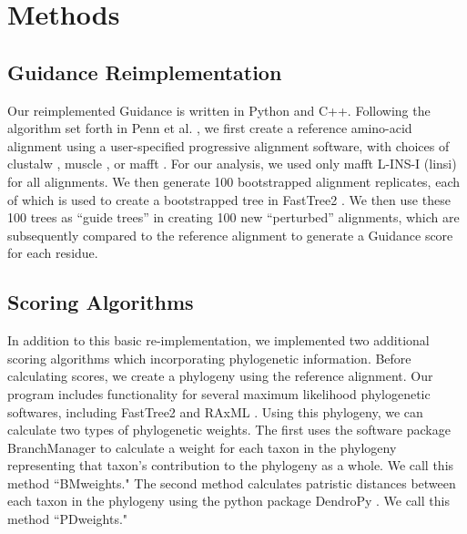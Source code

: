 \documentclass[10pt]{article}
\begin{document}
\section*{Methods}

\subsection*{Guidance Reimplementation}
Our reimplemented Guidance is written in Python and C++. Following the algorithm set forth in Penn et al. \citep{Penn2010}, we first create a reference amino-acid alignment using a user-specified progressive alignment software, with choices of clustalw \citep{Thompson1994}, muscle \citep{Edgar2004}, or mafft \citep{Katoh2002, Katoh2005}. For our analysis, we used only mafft L-INS-I (linsi) for all alignments. We then generate 100 bootstrapped alignment replicates, each of which is used to create a bootstrapped tree in FastTree2 \citep{Price2010}. We then use these 100 trees as “guide trees” in creating 100 new “perturbed” alignments, which are subsequently compared to the reference alignment to generate a Guidance score for each residue.

\subsection*{Scoring Algorithms}
In addition to this basic re-implementation, we implemented two additional scoring algorithms which incorporating phylogenetic information. Before calculating scores, we create a phylogeny using the reference alignment. Our program includes functionality for several maximum likelihood phylogenetic softwares, including FastTree2 \citep{Price2010} and RAxML \citep{Stamatakis2006}. Using this phylogeny, we can calculate two types of phylogenetic weights. The first uses the software package BranchManager \citep{Stone2007} to calculate a weight for each taxon in the phylogeny representing that taxon's contribution to the phylogeny as a whole. We call this method ``BMweights." The second method calculates patristic distances between each taxon in the phylogeny using the python package DendroPy \citep{Sukumaran2010}. We call this method ``PDweights."
\end{document}
